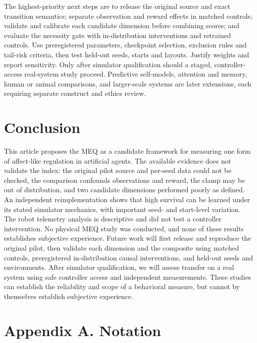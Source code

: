 \documentclass[twoside,11pt]{article}
\begin{document}
The highest-priority next steps are to release the original source and exact transition semantics; separate observation and reward effects in matched controls; validate and calibrate each candidate dimension before combining scores; and evaluate the necessity gate with in-distribution interventions and retrained controls. Use preregistered parameters, checkpoint selection, exclusion rules and tail-risk criteria, then test held-out seeds, starts and layouts. Justify weights and report sensitivity. Only after simulator qualification should a staged, controller-access real-system study proceed. Predictive self-models, attention and memory, human or animal comparisons, and larger-scale systems are later extensions, each requiring separate construct and ethics review.

\section{Conclusion}\label{sec:10}

This article proposes the MEQ as a candidate framework for measuring one form of affect-like regulation in artificial agents. The available evidence does not validate the index: the original pilot source and per-seed data could not be checked, the comparison confounds observations and reward, the clamp may be out of distribution, and two candidate dimensions performed poorly as defined. An independent reimplementation shows that high survival can be learned under its stated simulator mechanics, with important seed- and start-level variation. The robot telemetry analysis is descriptive and did not test a controller intervention. No physical MEQ study was conducted, and none of these results establishes subjective experience. Future work will first release and reproduce the original pilot, then validate each dimension and the composite using matched controls, preregistered in-distribution causal interventions, and held-out seeds and environments. After simulator qualification, we will assess transfer on a real system using safe controller access and independent measurements. These studies can establish the reliability and scope of a behavioral measure, but cannot by themselves establish subjective experience.



\section*{Appendix A. Notation}
\end{document}
